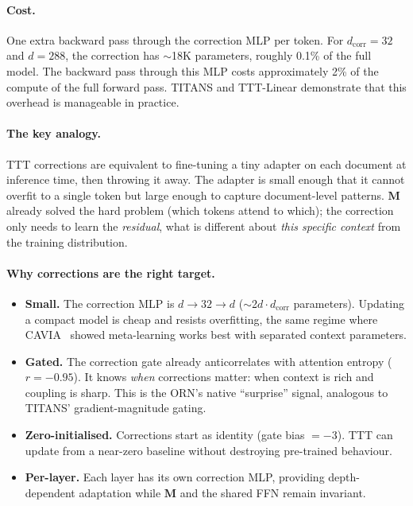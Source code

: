 \documentclass[11pt, a4paper]{article}
\newcommand{\M}{\mathbf{M}}
\theoremstyle{plain}
\theoremstyle{definition}
\theoremstyle{remark}
\begin{document}
\paragraph{Cost.}
One extra backward pass through the correction MLP per token.
For $d_{\mathrm{corr}} = 32$ and $d = 288$, the correction has $\sim$18K parameters, roughly 0.1\% of the full model.
The backward pass through this MLP costs approximately 2\% of the compute of the full forward pass.
TITANS and TTT-Linear demonstrate that this overhead is manageable in practice.

\paragraph{The key analogy.}
TTT corrections are equivalent to fine-tuning a tiny adapter on each document at inference time, then throwing it away.
The adapter is small enough that it cannot overfit to a single token but large enough to capture document-level patterns.
$\M$ already solved the hard problem (which tokens attend to which); the correction only needs to learn the \emph{residual}, what is different about \emph{this specific context} from the training distribution.

\paragraph{Why corrections are the right target.}
\begin{itemize}[nosep]
\item \textbf{Small.} The correction MLP is $d \to 32 \to d$ ($\sim$2$d \cdot d_{\mathrm{corr}}$ parameters). Updating a compact model is cheap and resists overfitting, the same regime where CAVIA~\cite{zintgraf2019cavia} showed meta-learning works best with separated context parameters.
\item \textbf{Gated.} The correction gate already anticorrelates with attention entropy ($r = -0.95$). It knows \emph{when} corrections matter: when context is rich and coupling is sharp. This is the ORN's native ``surprise'' signal, analogous to TITANS' gradient-magnitude gating.
\item \textbf{Zero-initialised.} Corrections start as identity (gate bias $= -3$). TTT can update from a near-zero baseline without destroying pre-trained behaviour.
\item \textbf{Per-layer.} Each layer has its own correction MLP, providing depth-dependent adaptation while $\M$ and the shared FFN remain invariant.
\end{itemize}
\end{document}
